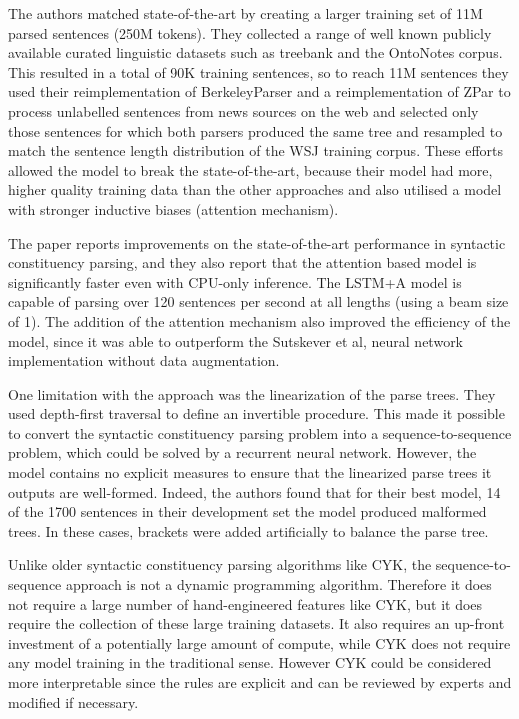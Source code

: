 \documentclass[
10pt, %
a4paper, %
oneside, %
headinclude,footinclude, %
BCOR5mm, %
]{scrartcl}
\begin{document}
The authors matched state-of-the-art by creating a larger training set of 11M parsed sentences (250M tokens). They collected a range of well known publicly available curated linguistic datasets such as treebank and the OntoNotes corpus. This resulted in a total of 90K training sentences, so to reach 11M sentences they used their reimplementation of BerkeleyParser and a reimplementation of ZPar to process unlabelled sentences from news sources on the web and selected only those sentences for which both parsers produced the same tree and resampled to match the sentence length distribution of the WSJ training corpus. These efforts allowed the model to break the state-of-the-art, because their model had more, higher quality training data than the other approaches and also utilised a model with stronger inductive biases (attention mechanism).

The paper reports improvements on the state-of-the-art performance in syntactic constituency parsing, and they also report that the attention based model is significantly faster even with CPU-only inference. The LSTM+A model is capable of parsing over 120 sentences per second at all lengths (using a beam size of 1). The addition of the attention mechanism also improved the efficiency of the model, since it was able to outperform the Sutskever et al, neural network implementation without data augmentation.

One limitation with the approach was the linearization of the parse trees. They used depth-first traversal to define an invertible procedure. This made it possible to convert the syntactic constituency parsing problem into a sequence-to-sequence problem, which could be solved by a recurrent neural network. However, the model contains no explicit measures to ensure that the linearized parse trees it outputs are well-formed. Indeed, the authors found that for their best model, 14 of the 1700 sentences in their development set the model produced malformed trees. In these cases, brackets were added artificially to balance the parse tree.

Unlike older syntactic constituency parsing algorithms like CYK, the sequence-to-sequence approach is not a dynamic programming algorithm. Therefore it does not require a large number of hand-engineered features like CYK, but it does require the collection of these large training datasets. It also requires an up-front investment of a potentially large amount of compute, while CYK does not require any model training in the traditional sense. However CYK could be considered more interpretable since the rules are explicit and can be reviewed by experts and modified if necessary.
\end{document}
